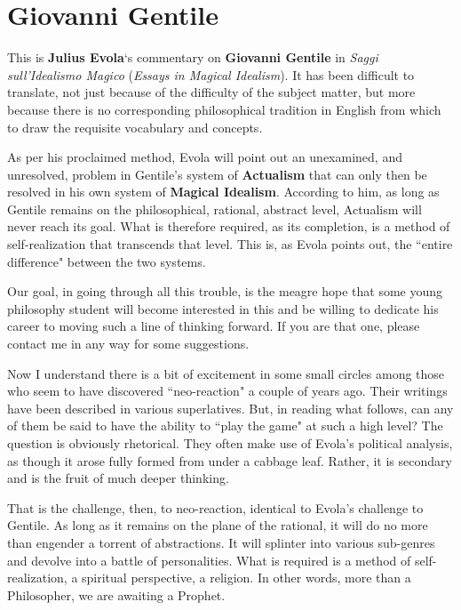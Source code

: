 \section{Giovanni Gentile}

\begin{quotex}
This is \textbf{Julius Evola}`s commentary on \textbf{Giovanni Gentile} in \textit{Saggi sull'Idealismo Magico} (\emph{Essays in Magical Idealism}). It has been difficult to translate, not just because of the difficulty of the subject matter, but more because there is no corresponding philosophical tradition in English from which to draw the requisite vocabulary and concepts.

As per his proclaimed method, Evola will point out an unexamined, and unresolved, problem in Gentile's system of \textbf{Actualism} that can only then be resolved in his own system of \textbf{Magical Idealism}. According to him, as long as Gentile remains on the philosophical, rational, abstract level, Actualism will never reach its goal. What is therefore required, as its completion, is a method of self-realization that transcends that level. This is, as Evola points out, the ``entire difference" between the two systems.

Our goal, in going through all this trouble, is the meagre hope that some young philosophy student will become interested in this and be willing to dedicate his career to moving such a line of thinking forward. If you are that one, please contact me in any way for some suggestions.

Now I understand there is a bit of excitement in some small circles among those who seem to have discovered ``neo-reaction" a couple of years ago. Their writings have been described in various superlatives. But, in reading what follows, can any of them be said to have the ability to ``play the game" at such a high level? The question is obviously rhetorical. They often make use of Evola's political analysis, as though it arose fully formed from under a cabbage leaf. Rather, it is secondary and is the fruit of much deeper thinking.

That is the challenge, then, to neo-reaction, identical to Evola's challenge to Gentile. As long as it remains on the plane of the rational, it will do no more than engender a torrent of abstractions. It will splinter into various sub-genres and devolve into a battle of personalities. What is required is a method of self-realization, a spiritual perspective, a religion. In other words, more than a Philosopher, we are awaiting a Prophet. 

\end{quotex}
